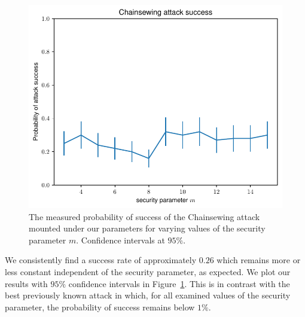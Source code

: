 \begin{figure}[h!]
	\begin{center}
		\includegraphics[width=\columnwidth]{figures/attack-confidence.pdf}
	\end{center}
	\caption{The measured probability of success of the Chainsewing attack mounted under our parameters for varying values of the security parameter $m$. Confidence intervals at $95\%$.}
	\label{fig:confidence}
\end{figure}

We consistently find a success rate of approximately $0.26$ which remains more or less constant independent of the security parameter, as expected. We plot our results with $95\%$ confidence intervals in Figure~\ref{fig:confidence}. This is in contrast with the best previously known attack in which, for all examined values of the security parameter, the probability of success remains below $1\%$.
